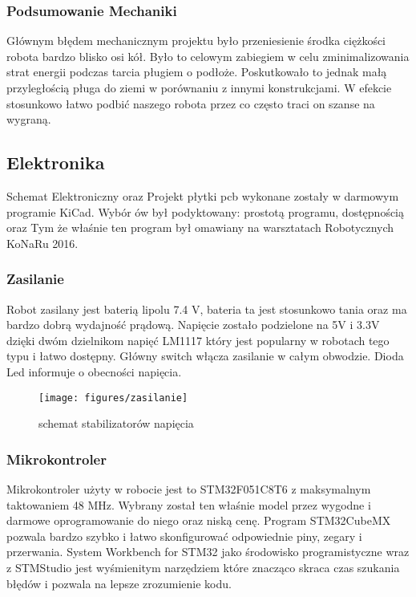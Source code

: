 \documentclass[12pt,a4paper]{article}
\begin{document}
\subsubsection{Podsumowanie Mechaniki}
Głównym błędem mechanicznym projektu było przeniesienie środka ciężkości robota bardzo blisko osi kół. Było to celowym zabiegiem w celu zminimalizowania strat energii podczas tarcia pługiem o podłoże. Poskutkowało to jednak małą przyległością pługa do ziemi w porównaniu z innymi konstrukcjami. W efekcie stosunkowo łatwo podbić naszego robota przez co często traci on szanse na wygraną.

\subsection{Elektronika}
Schemat Elektroniczny oraz Projekt płytki pcb wykonane zostały w darmowym programie KiCad. Wybór ów był podyktowany: prostotą programu, dostępnością oraz Tym że właśnie ten program był omawiany na warsztatach Robotycznych KoNaRu 2016.

\subsubsection{Zasilanie}
Robot zasilany jest baterią lipolu 7.4 V, bateria ta jest stosunkowo tania oraz ma bardzo dobrą wydajność prądową. Napięcie zostało podzielone na 5V i 3.3V dzięki dwóm dzielnikom napięć LM1117 który jest popularny w robotach tego typu i łatwo dostępny. Główny switch włącza zasilanie w całym obwodzie. Dioda Led informuje o obecności napięcia. 

\begin{figure}[!]
\centering
\texttt{[image: figures/zasilanie]}
\caption{schemat stabilizatorów napięcia  \label{fig:zasilanie}}
\end{figure}

\subsubsection{Mikrokontroler}
Mikrokontroler użyty w robocie jest to STM32F051C8T6 z maksymalnym taktowaniem 48 MHz. Wybrany został ten właśnie model przez wygodne i darmowe oprogramowanie do niego oraz niską cenę. Program STM32CubeMX pozwala bardzo szybko i łatwo skonfigurować odpowiednie piny, zegary i przerwania. System Workbench for STM32 jako środowisko programistyczne wraz z STMStudio jest wyśmienitym narzędziem które znacząco skraca czas szukania błędów i pozwala na lepsze zrozumienie kodu. 
\end{document}
